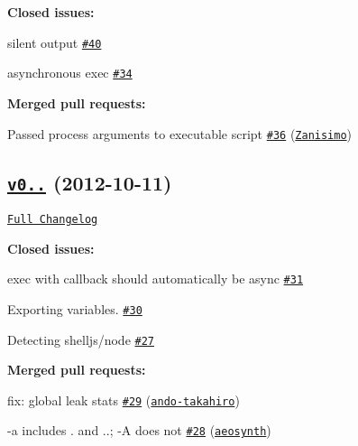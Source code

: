 {\bfseries Closed issues\+:}


\begin{DoxyItemize}
\item silent output \href{https://github.com/shelljs/shelljs/issues/40}{\tt \#40}
\item asynchronous exec \href{https://github.com/shelljs/shelljs/issues/34}{\tt \#34}
\end{DoxyItemize}

{\bfseries Merged pull requests\+:}


\begin{DoxyItemize}
\item Passed process arguments to executable script \href{https://github.com/shelljs/shelljs/pull/36}{\tt \#36} (\href{https://github.com/Zanisimo}{\tt Zanisimo})
\end{DoxyItemize}

\subsection*{\href{https://github.com/shelljs/shelljs/tree/v0.0.8}{\tt v0..} (2012-\/10-\/11)}

\href{https://github.com/shelljs/shelljs/compare/v0.0.7...v0.0.8}{\tt Full Changelog}

{\bfseries Closed issues\+:}


\begin{DoxyItemize}
\item exec with callback should automatically be async \href{https://github.com/shelljs/shelljs/issues/31}{\tt \#31}
\item Exporting variables. \href{https://github.com/shelljs/shelljs/issues/30}{\tt \#30}
\item Detecting shelljs/node \href{https://github.com/shelljs/shelljs/issues/27}{\tt \#27}
\end{DoxyItemize}

{\bfseries Merged pull requests\+:}


\begin{DoxyItemize}
\item fix\+: global leak \textquotesingle{}stats\textquotesingle{} \href{https://github.com/shelljs/shelljs/pull/29}{\tt \#29} (\href{https://github.com/ando-takahiro}{\tt ando-\/takahiro})
\item -\/a includes . and ..; -\/A does not \href{https://github.com/shelljs/shelljs/pull/28}{\tt \#28} (\href{https://github.com/aeosynth}{\tt aeosynth})
\end{DoxyItemize}

